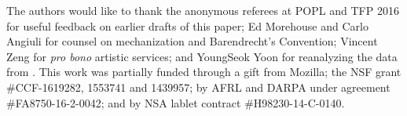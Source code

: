 
The authors would like to thank the anonymous referees at POPL and TFP 2016  for useful feedback on earlier drafts of this paper; Ed Morehouse and Carlo Angiuli for counsel on mechanization and Barendrecht's
Convention; Vincent Zeng for \textit{pro bono} artistic services; and YoungSeok Yoon for reanalyzing the data from \cite{6883030}.
This work was partially funded through a gift from Mozilla; the NSF grant \#CCF-1619282, 1553741 and 1439957; by AFRL and DARPA under agreement \#FA8750-16-2-0042; and by NSA lablet contract \#H98230-14-C-0140. %
